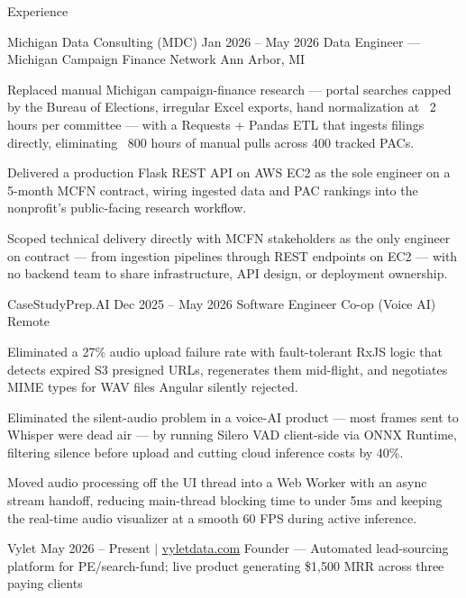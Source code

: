 \documentclass[
	11pt
]{../../../template}
\begin{document}
	\begin{rSection}{E}{xperience}
		\begin{rSectionEntry}
			{Michigan Data Consulting (MDC)}
			{Jan 2026 -- May 2026}
			{Data Engineer --- Michigan Campaign Finance Network}
			{}
			{Ann Arbor, MI}

			\item Replaced manual Michigan campaign-finance research --- portal searches capped by the Bureau of Elections, irregular Excel exports, hand normalization at ~2 hours per committee --- with a Requests + Pandas ETL that ingests filings directly, eliminating ~800 hours of manual pulls across 400 tracked PACs.
			\item Delivered a production Flask REST API on AWS EC2 as the sole engineer on a 5-month MCFN contract, wiring ingested data and PAC rankings into the nonprofit's public-facing research workflow.
			\item Scoped technical delivery directly with MCFN stakeholders as the only engineer on contract --- from ingestion pipelines through REST endpoints on EC2 --- with no backend team to share infrastructure, API design, or deployment ownership.
		\end{rSectionEntry}

		\begin{rSectionEntry}
			{CaseStudyPrep.AI}
			{Dec 2025 -- May 2026}
			{Software Engineer Co-op (Voice AI)}
			{}
			{Remote}

			\item Eliminated a 27\% audio upload failure rate with fault-tolerant RxJS logic that detects expired S3 presigned URLs, regenerates them mid-flight, and negotiates MIME types for WAV files Angular silently rejected.
			\item Eliminated the silent-audio problem in a voice-AI product --- most frames sent to Whisper were dead air --- by running Silero VAD client-side via ONNX Runtime, filtering silence before upload and cutting cloud inference costs by 40\%.
			\item Moved audio processing off the UI thread into a Web Worker with an async stream handoff, reducing main-thread blocking time to under 5ms and keeping the real-time audio visualizer at a smooth 60 FPS during active inference.
		\end{rSectionEntry}

		\begin{rSectionEntry}
			{Vylet}
			{May 2026 -- Present $\vert$ \href{https://vyletdata.com}{vyletdata.com}}
			{Founder --- Automated lead-sourcing platform for PE/search-fund; live product generating \$1,500 MRR across three paying clients}
			{}
			{}


\end{rSectionEntry}
\end{rSection}
\end{document}
